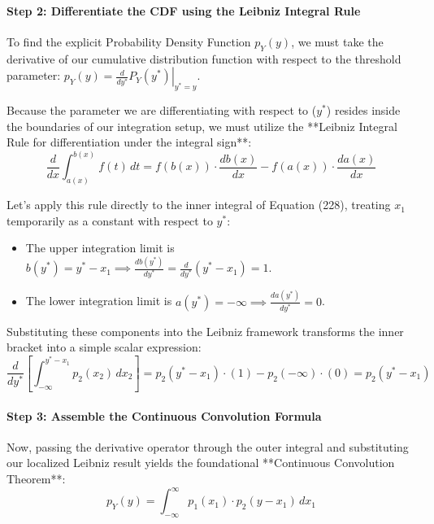 \documentclass{article}
\begin{document}
\paragraph{Step 2: Differentiate the CDF using the Leibniz Integral Rule}
To find the explicit Probability Density Function $p_Y(y)$, we must take the derivative of our cumulative distribution function with respect to the threshold parameter: $p_Y(y) = \left. \frac{d}{dy^*} P_Y(y^*) \right|_{y^* = y}$. 

Because the parameter we are differentiating with respect to ($y^*$) resides inside the boundaries of our integration setup, we must utilize the **Leibniz Integral Rule for differentiation under the integral sign**:
\begin{equation}
\frac{d}{dx} \int_{a(x)}^{b(x)} f(t) \, dt = f(b(x)) \cdot \frac{db(x)}{dx} - f(a(x)) \cdot \frac{da(x)}{dx} \tag{229}
\end{equation}

Let's apply this rule directly to the inner integral of Equation (228), treating $x_1$ temporarily as a constant with respect to $y^*$:
\begin{itemize}
    \item The upper integration limit is $b(y^*) = y^* - x_1 \implies \frac{db(y^*)}{dy^*} = \frac{d}{dy^*}(y^* - x_1) = 1$.
    \item The lower integration limit is $a(y^*) = -\infty \implies \frac{da(y^*)}{dy^*} = 0$.
\end{itemize}

Substituting these components into the Leibniz framework transforms the inner bracket into a simple scalar expression:
\begin{equation*}
\frac{d}{dy^*} \left[ \int_{-\infty}^{y^* - x_1} p_2(x_2) \, dx_2 \right] = p_2(y^* - x_1) \cdot (1) - p_2(-\infty) \cdot (0) = p_2(y^* - x_1)
\end{equation*}

\paragraph{Step 3: Assemble the Continuous Convolution Formula}
Now, passing the derivative operator through the outer integral and substituting our localized Leibniz result yields the foundational **Continuous Convolution Theorem**:
\begin{equation}
p_Y(y) = \int_{-\infty}^{\infty} p_1(x_1) \cdot p_2(y - x_1) \, dx_1 \tag{230}
\end{equation}
\end{document}
